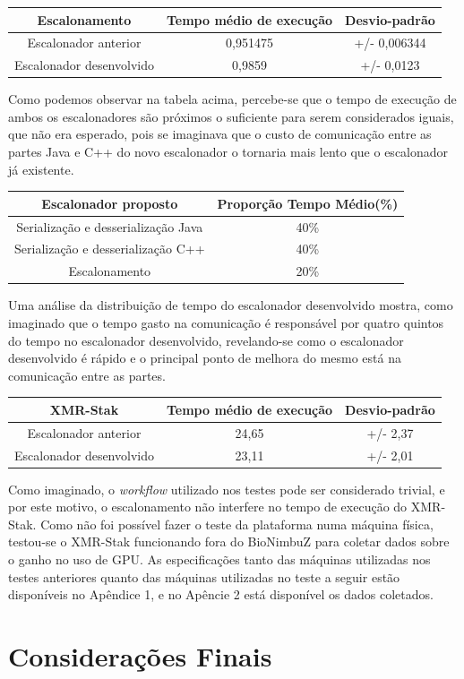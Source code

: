 \begin{center}
	\begin{tabular}{ |c|c|c| } 
		\hline
		Escalonamento & Tempo médio de execução & Desvio-padrão \\ 
		\hline
		Escalonador anterior & 0,951475 & +/- 0,006344 \\ 
		\hline
		Escalonador desenvolvido & 0,9859 & +/- 0,0123 \\ 
		\hline
	\end{tabular}
\end{center}

Como podemos observar na tabela acima, percebe-se que o tempo de execução de ambos os escalonadores são próximos o suficiente para serem considerados iguais, que não era esperado, pois se imaginava que o custo de comunicação entre as partes Java e C++ do novo escalonador o tornaria mais lento que o escalonador já existente.

\begin{center}
	\begin{tabular}{ |c|c| } 
		\hline
		Escalonador proposto & Proporção Tempo Médio(\%) \\ 
		\hline
		Serialização e desserialização Java & 40\% \\ 
		\hline
		Serialização e desserialização C++ & 40\% \\ 
		\hline
		Escalonamento & 20\% \\ 
		\hline
	\end{tabular}
\end{center}

Uma análise da distribuição de tempo do escalonador desenvolvido mostra, como imaginado que o tempo gasto na comunicação é responsável por quatro quintos do tempo no escalonador desenvolvido, revelando-se como o escalonador desenvolvido é rápido e o principal ponto de melhora do mesmo está na comunicação entre as partes.

\begin{center}
	\begin{tabular}{ |c|c|c| } 
		\hline
		XMR-Stak & Tempo médio de execução & Desvio-padrão \\ 
		\hline
		Escalonador anterior & 24,65 & +/- 2,37 \\ 
		\hline
		Escalonador desenvolvido & 23,11 & +/- 2,01 \\ 
		\hline
	\end{tabular}
\end{center}

Como imaginado, o \textit{workflow} utilizado nos testes pode ser considerado trivial, e por este motivo, o escalonamento não interfere no tempo de execução do XMR-Stak. Como não foi possível fazer o teste da plataforma numa máquina física, testou-se o XMR-Stak funcionando fora do BioNimbuZ para coletar dados sobre o ganho no uso de GPU. As especificações tanto das máquinas utilizadas nos testes anteriores quanto das máquinas utilizadas no teste a seguir estão disponíveis no Apêndice 1, e no Apêncie 2 está disponível os dados coletados.

 
\section{Considerações Finais}


